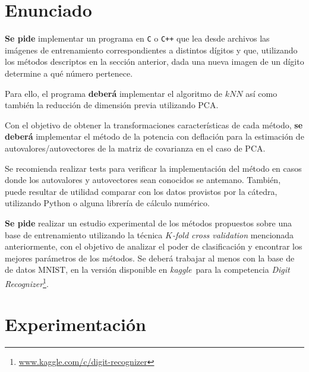\documentclass[11pt, a4paper]{article}
\newcommand{\kkfold}{K}
\newcommand{\kaggle}{\textit{kaggle}}
\begin{document}
\section*{Enunciado}

\textbf{Se pide} implementar un programa en \verb+C+ o \verb-C++- que lea desde archivos las imágenes de entrenamiento correspondientes a distintos dígitos y que, utilizando los métodos descriptos en la sección anterior, dada una nueva imagen de un dígito determine a qué número pertenece. 

Para ello, el programa \textbf{deberá} implementar el algoritmo de $kNN$ así como también la reducción de dimensión previa utilizando PCA.

Con el objetivo de obtener la transformaciones características de cada método, \textbf{se deberá} implementar el método de la potencia con deflación para la estimación de autovalores/autovectores de la matriz de covarianza en el caso de PCA. 

Se recomienda realizar tests para verificar la implementación del método en casos donde los autovalores y autovectores sean conocidos se antemano. También, puede resultar de utilidad comparar con los datos provistos por la cátedra, utilizando Python o alguna librería de cálculo numérico.

\textbf{Se pide} realizar un estudio experimental de los métodos propuestos sobre una base de entrenamiento  utilizando la técnica \emph{$\kkfold$-fold cross validation} mencionada anteriormente,
con el objetivo de analizar el poder de clasificación y encontrar los mejores parámetros de los métodos.
%
Se deberá trabajar al menos con la base de de datos MNIST, en la versión disponible en \kaggle\ para la competencia \textit{Digit Recognizer}\footnote{\url{www.kaggle.com/c/digit-recognizer}}. 
%

\section*{Experimentación}
\end{document}
